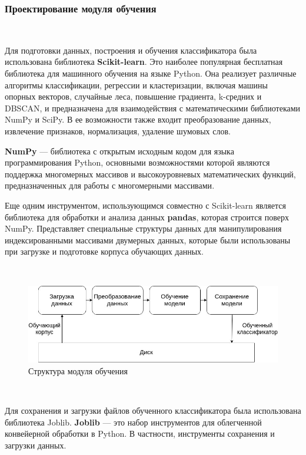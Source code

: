 \newpage
\subsubsection{Проектирование модуля обучения}
\

Для подготовки данных, построения и обучения классификатора была использована библиотека \textbf{Scikit-learn}.\cite{Scikit} Это наиболее популярная бесплатная библиотека для машинного обучения на языке Python. Она реализует различные алгоритмы классификации, регрессии и кластеризации, включая машины опорных векторов, случайные леса, повышение градиента, k-средних и DBSCAN, и предназначена для взаимодействия с математическими библиотеками NumPy и SciPy. В ее возможности также входит преобразование данных, извлечение признаков, нормализация, удаление шумовых слов.

\textbf{NumPy} — библиотека с открытым исходным кодом для языка программирования Python, основными возможностями которой являются поддержка многомерных массивов и высокоуровневых математических функций, предназначенных для работы с многомерными массивами\cite{NumPy}.

Еще одним инструментом, использующимся совместно с Scikit-learn является библиотека для обработки и анализа данных \textbf{pandas}, которая строится поверх NumPy. Представляет специальные структуры данных для манипулирования индексированными массивами двумерных данных, которые были использованы при загрузке и подготовке корпуса обучающих данных\cite{pandas}.

\

  \begin{figure}[h!]
    \centering
    \setlength{\fboxsep}{5pt}
    \includegraphics[width=.99\textwidth]{img/learn-module}
    \vspace*{6pt}
    \caption{Структура модуля обучения}\label{fig:project-tree}
  \end{figure}

 \

Для сохранения и загрузки файлов обученного классификатора была использована библиотека Joblib. \textbf{Joblib} — это набор инструментов для облегченной конвейерной обработки в Python. В частности, инструменты сохранения и загрузки данных\cite{Joblib}.

